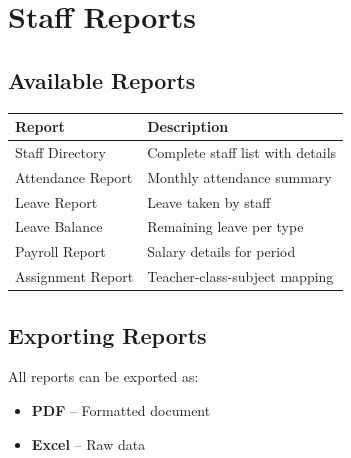 \documentclass[12pt,a4paper]{report}
\begin{document}
\chapter{Staff Reports}

\section{Available Reports}

\begin{longtable}{@{}p{4cm}p{9cm}@{}}
\toprule
\textbf{Report} & \textbf{Description} \\
\midrule
\endhead
Staff Directory & Complete staff list with details \\
Attendance Report & Monthly attendance summary \\
Leave Report & Leave taken by staff \\
Leave Balance & Remaining leave per type \\
Payroll Report & Salary details for period \\
Assignment Report & Teacher-class-subject mapping \\
\bottomrule
\end{longtable}

\section{Exporting Reports}

All reports can be exported as:
\begin{itemize}[leftmargin=*]
    \item \textbf{PDF} -- Formatted document
    \item \textbf{Excel} -- Raw data
\end{itemize}
\end{document}
